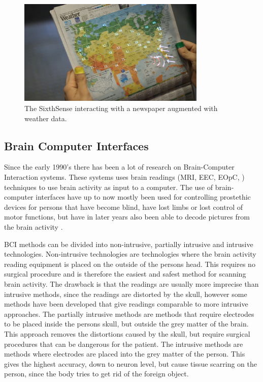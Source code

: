 \begin{figure}[]
\includegraphics[width=0.8\textwidth] {bilder/newspaper.jpg}
\caption{The SixthSense interacting with a newspaper augmented with weather data.}
\label{sixthsense}
\end{figure}
\nocite{sixthsense}


\subsection{Brain Computer Interfaces}

Since the early 1990's there has been a lot of research on Brain-Computer Interaction systems. These systems uses brain readings (MRI, EEC, EOpC, ) techniques to use brain activity as input to a computer. The use of brain-computer interfaces have up to now mostly been used for controlling prostethic devices for persons that have become blind, have lost limbs or lost control of motor functions, but have in later years also been able to decode pictures from the brain activity .

BCI methods can be divided into non-intrusive, partially intrusive and intrusive technologies. Non-intrusive technologies are technologies where the brain activity reading equipment is placed on the outside of the persons head. This requires no surgical procedure and is therefore the easiest and safest method for scanning brain activity. The drawback is that the readings are usually more imprecise than intrusive methods, since the readings are distorted by the skull, however some  methods have been developed that give readings comparable to more intrusive approaches.
The partially intrusive methods are methods that require electrodes to be placed inside the persons skull, but outside the grey matter of the brain. This approach removes the distortions caused by the skull, but require surgical procedures that can be dangerous for the patient. The intrusive methods are methods where electrodes are placed into the grey matter of the person. This gives the highest accuracy, down to neuron level, but cause tissue scarring on the person, since the body tries to get rid of the foreign object.


